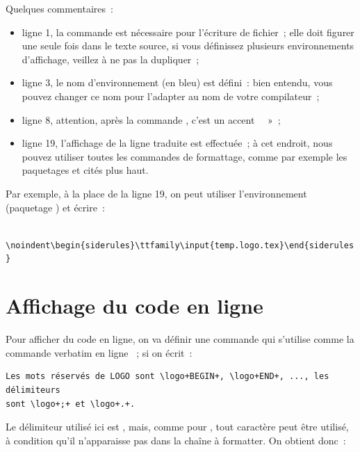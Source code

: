 Quelques commentaires~:
\begin{itemize}
  \item ligne 1, la commande  est nécessaire pour l'écriture de fichier~; elle doit figurer une seule fois dans le texte source, si vous définissez plusieurs environnements d'affichage, veillez à ne pas la dupliquer~;
  \item ligne 3, le nom d'environnement (en bleu) est défini~: bien entendu, vous pouvez changer ce nom pour l'adapter au nom de votre compilateur~;
  \item ligne 8, attention, après la commande , c'est un accent ~~»~;
  \item ligne 19, l'affichage de la ligne traduite est effectuée~; à cet endroit, nous pouvez utiliser toutes les commandes de formattage, comme par exemple les paquetages  et  cités plus haut.
\end{itemize}

Par exemple, à la place de la ligne 19, on peut utiliser l'environnement  (paquetage ) et écrire~:

\texttt{
\textbackslash noindent\textbackslash begin\{siderules\}\textbackslash ttfamily\textbackslash input\{temp.logo.tex\}\textbackslash end\{siderules\}
}












\section{Affichage du code en ligne}

Pour afficher du code en ligne, on va définir une commande  qui s'utilise comme la commande verbatim en ligne ~; si on écrit~:

\begin{verbatim}
Les mots réservés de LOGO sont \logo+BEGIN+, \logo+END+, ..., les délimiteurs
sont \logo+;+ et \logo+.+.
\end{verbatim}

Le délimiteur utilisé ici est \tpp{+}, mais, comme pour , tout caractère peut être utilisé, à condition qu'il n'apparaisse pas dans la chaîne à formatter. On obtient donc~:

